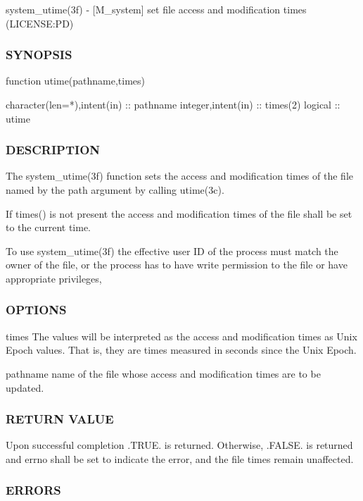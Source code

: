 system\+\_\+utime(3f) -\/ \mbox{[}M\+\_\+system\mbox{]} set file access and modification times (L\+I\+C\+E\+N\+SE\+:PD) 

\subsubsection*{S\+Y\+N\+O\+P\+S\+IS}

\begin{DoxyVerb}    function utime(pathname,times)

     character(len=*),intent(in) :: pathname
     integer,intent(in)          :: times(2)
     logical                     :: utime
\end{DoxyVerb}


\subsubsection*{D\+E\+S\+C\+R\+I\+P\+T\+I\+ON}

The system\+\_\+utime(3f) function sets the access and modification times of the file named by the path argument by calling utime(3c).

If times() is not present the access and modification times of the file shall be set to the current time.

To use system\+\_\+utime(3f) the effective user ID of the process must match the owner of the file, or the process has to have write permission to the file or have appropriate privileges,

\subsubsection*{O\+P\+T\+I\+O\+NS}

times The values will be interpreted as the access and modification times as Unix Epoch values. That is, they are times measured in seconds since the Unix Epoch.

pathname name of the file whose access and modification times are to be updated.

\subsubsection*{R\+E\+T\+U\+RN V\+A\+L\+UE}

Upon successful completion .T\+R\+UE. is returned. Otherwise, .F\+A\+L\+SE. is returned and errno shall be set to indicate the error, and the file times remain unaffected.

\subsubsection*{E\+R\+R\+O\+RS}

